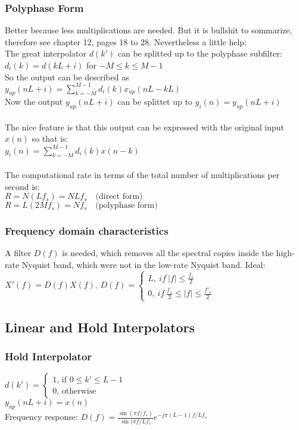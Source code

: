 \subsubsection{Polyphase Form}
Better because less multiplications are needed. But it is bullshit to sommarize, therefore see chapter 12, pages 18 to 28.
Nevertheless a little help:\\
The great interpolator $d(k')$ can be splitted up to the polyphase subfilter: $d_i(k) = d(kL+i)$ for $-M\leq k \leq M-1$\\
So the output can be described as $y_{up}(nL+i)=\sum\limits_{k=-M}^{M-1} d_i(k) x_{up}(nL-kL)$\\
Now the output $y_{up}(nL+i)$ can be splittet up to $y_i(n)=y_{up}(nL+i)$\\\\
The nice feature is that this output can be expressed with the original input $x(n)$ so that is:\\ $y_i(n)=\sum\limits_{k=-M}^{M-1} d_i(k) x(n-k)$\\\\
The computational rate in terms of the total number of multiplications per second is:\\
 $R=N (L f_s)=N L f_s \quad \text{(direct form)}$\\
 $R=L (2M f_s)=N f_s \quad \text{(polyphase form)}$\\
\subsubsection{Frequency domain characteristics}
A filter $D(f)$ is needed, which removes all the spectral copies inside the high-rate Nyquist band, which were not in the low-rate Nyquist band. Ideal: $X'(f) = D(f)X(f)$.
$D(f)=\begin{cases} L,\ if\ |f|\leq\frac{f_s}{2}\\
0,\ if\ \frac{f_s}{2}\leq |f|\leq\frac{f'_s}{2}
\end{cases}$

\subsection{Linear and Hold Interpolators}
\subsubsection{Hold Interpolator}
$d(k')=\begin{cases}
1\text{, if }0\leq k' \leq L -1\\
0\text{, otherwise}\end{cases}$\\
$y_{up}(nL+i)=x(n)$\\
Frequency response: $D(f)=\frac{\sin(\pi f/f_s)}{\sin(\pi f/Lf_s}e^{-j\pi(L-1)f/Lf_s}$
